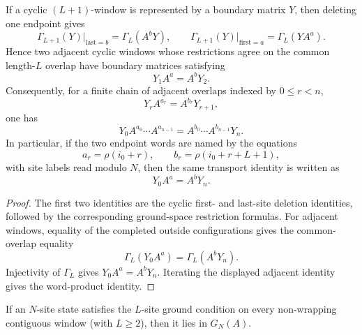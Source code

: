 \begin{lemma}
    \label{lem:cyclic_window_boundary_matrix_transport}
    \leanok
    If a cyclic $(L+1)$-window is represented by a boundary matrix $Y$, then
    deleting one endpoint gives
    \[
        \Gamma_{L+1}(Y)\big|_{\text{last}=b}=\Gamma_L(A^bY),
        \qquad
        \Gamma_{L+1}(Y)\big|_{\text{first}=a}=\Gamma_L(YA^a).
    \]
    Hence two adjacent cyclic windows whose restrictions agree on the common
    length-$L$ overlap have boundary matrices satisfying
    \[
        Y_1 A^a = A^b Y_2.
    \]
    Consequently, for a finite chain of adjacent overlaps indexed by
    \(0\le r<n\),
    \[
        Y_rA^{a_r}=A^{b_r}Y_{r+1},
    \]
    one has
    \[
        Y_0A^{a_0}\cdots A^{a_{n-1}}
        =
        A^{b_0}\cdots A^{b_{n-1}}Y_n .
    \]
    In particular, if the two endpoint words are named by the equations
    \[
        a_r=\rho(i_0+r),\qquad
        b_r=\rho(i_0+r+L+1),
    \]
    with site labels read modulo $N$, then the same transport identity is
    written as
    \[
        Y_0A^a=A^bY_n .
    \]
\end{lemma}

\begin{proof}
    \leanok
    The first two identities are the cyclic first- and last-site deletion
    identities, followed by the corresponding ground-space restriction formulas.
    For adjacent windows, equality of the completed outside configurations gives
    the common-overlap equality
    \[
        \Gamma_L(Y_0A^a)=\Gamma_L(A^bY_n).
    \]
    Injectivity of $\Gamma_L$ gives $Y_0A^a=A^bY_n$.
    Iterating the displayed adjacent identity gives the word-product identity.
\end{proof}

\begin{lemma}\label{lem:contiguous_mem_ground_space}
    \leanok
    If an $N$-site state satisfies the $L$-site ground condition on every
    non-wrapping contiguous window (with $L \ge 2$), then it lies in $G_N(A)$.
\end{lemma}

